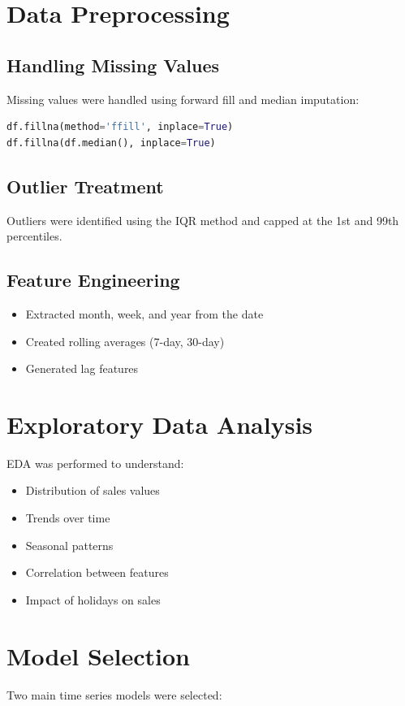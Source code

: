 \documentclass[12pt,a4paper]{report}
\begin{document}
\section{Data Preprocessing}
\label{sec:preprocessing}

\subsection{Handling Missing Values}
Missing values were handled using forward fill and median imputation:
\begin{lstlisting}[language=Python]
df.fillna(method='ffill', inplace=True)
df.fillna(df.median(), inplace=True)
\end{lstlisting}

\subsection{Outlier Treatment}
Outliers were identified using the IQR method and capped at the 1st and 99th percentiles.

\subsection{Feature Engineering}
\begin{itemize}
    \item Extracted month, week, and year from the date
    \item Created rolling averages (7-day, 30-day)
    \item Generated lag features
\end{itemize}

\section{Exploratory Data Analysis}
\label{sec:eda_method}
EDA was performed to understand:
\begin{itemize}
    \item Distribution of sales values
    \item Trends over time
    \item Seasonal patterns
    \item Correlation between features
    \item Impact of holidays on sales
\end{itemize}

\section{Model Selection}
\label{sec:model_selection}
Two main time series models were selected:
\end{document}
